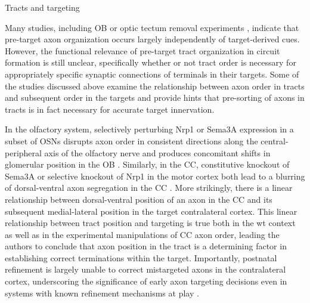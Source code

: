 Tracts and targeting

Many studies, including OB \cite{stjohn2003sorting} or optic tectum removal experiments \cite{reh1983organization}, indicate that pre-target axon organization occurs largely independently of target-derived cues.
However, the functional relevance of pre-target tract organization in circuit formation is still unclear, specifically whether or not tract order is necessary for appropriately specific synaptic connections of terminals in their targets.
Some of the studies discussed above examine the relationship between axon order in tracts and subsequent order in the targets and provide hints that pre-sorting of axons in tracts is in fact necessary for accurate target innervation.

In the olfactory system, selectively perturbing Nrp1 or Sema3A expression in a subset of OSNs disrupts axon order in consistent directions along the central-peripheral axis of the olfactory nerve and produces concomitant shifts in glomerular position in the OB \cite{imai2009pre}.
Similarly, in the CC, constitutive knockout of Sema3A or selective knockout of Nrp1 in the motor cortex both lead to a blurring of dorsal-ventral axon segregation in the CC \cite{zhou2013axon}.
More strikingly, there is a linear relationship between dorsal-ventral position of an axon in the CC and its subsequent medial-lateral position in the target contralateral cortex.
This linear relationship between tract position and targeting is true both in the wt context as well as in the experimental manipulations of CC axon order, leading the authors to conclude that axon position in the tract is a determining factor in establishing correct terminations within the target.
Importantly, postnatal refinement is largely unable to correct mistargeted axons in the contralateral cortex, underscoring the significance of early axon targeting decisions even in systems with known refinement mechanisms at play \cite{zhou2013axon}.

